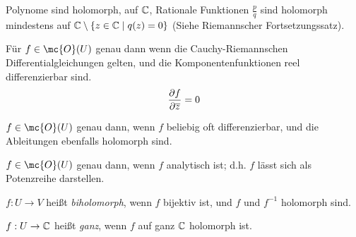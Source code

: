 \documentclass[ngerman]{report}
\begin{document}
\begin{example}
    Polynome sind holomorph, auf $\C$, Rationale Funktionen $\frac{p}{q}$ sind holomorph mindestens auf $\C\setminus\{z\in\C\mid q(z) = 0\}$ (Siehe Riemannscher Fortsetzungssatz).
\end{example}
\begin{theorem}
    Für $f\in \mc{O}(U)$ genau dann wenn die Cauchy-Riemannschen Differentialgleichungen gelten, und die Komponentenfunktionen reel differenzierbar sind. 
    \begin{align*}
        \pder[f]{\overline{z}} = 0
    \end{align*}
\end{theorem}
\begin{theorem}
    $f\in \mc{O}(U)$ genau dann, wenn $f$ beliebig oft differenzierbar, und die Ableitungen ebenfalls holomorph sind.
\end{theorem}
\begin{theorem}
    $f\in \mc{O}(U)$ genau dann, wenn $f$ analytisch ist; d.h. $f$ lässt sich als Potenzreihe darstellen.
\end{theorem}
\begin{definition}
    $f:U\to V$ heißt \emph{biholomorph}, wenn $f$ bijektiv ist, und $f$ und $f^{-1}$ holomorph sind.
\end{definition}
\begin{definition}
    $f:U\to\C$ heißt \emph{ganz}, wenn $f$ auf ganz $\C$ holomorph ist.
\end{definition}
\end{document}
